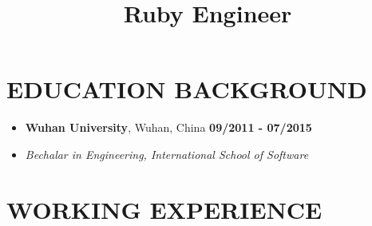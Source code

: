 \documentclass[12pt, a4paper,sans]{moderncv}       %
\title{Ruby Engineer}                               %
\begin{document}
\makecvtitle
\vspace{-38pt}

\section{EDUCATION BACKGROUND}
    \begin{itemize}
        \item{\textbf{Wuhan University}, {Wuhan, China} \hfill\textbf{09/2011 - 07/2015}}
    \end{itemize}

    \begin{itemize}
        \item{\textit{Bechalar in Engineering, International School of Software}}
    \end{itemize}

\vspace{-8pt}


\section{WORKING EXPERIENCE}
\end{document}
